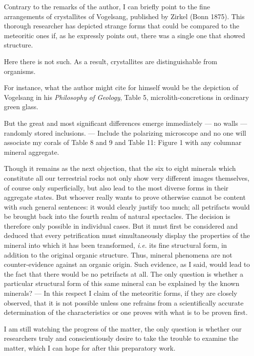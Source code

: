 \documentclass[a4paper, 12pt, oneside]{article}
\begin{document}
Contrary to the remarks of the author, I can briefly point to the fine arrangements of crystallites of Vogelsang, published by Zirkel (Bonn 1875). This thorough researcher has depicted strange forms that could be compared to the meteoritic ones if, as he expressly points out, there was a single one that showed structure.

Here there is not such. As a result, crystallites are distinguishable from organisms.

For instance, what the author might cite for himself would be the depiction of Vogelsang in his \emph{Philosophy of Geology}, Table 5, microlith-concretions in ordinary green glass.

But the great and most significant differences emerge immediately --- no walls --- randomly stored inclusions. --- Include the polarizing microscope and no one will associate my corals of Table 8 and 9 and Table 11: Figure 1 with any columnar mineral aggregate.

Though it remains as the next objection, that the six to eight minerals which constitute all our terrestrial rocks not only show very different images themselves, of course only superficially, but also lead to the most diverse forms in their aggregate states. But whoever really wants to prove otherwise cannot be content with such general sentences: it would clearly justify too much; all petrifacts would be brought back into the fourth realm of natural spectacles. The decision is therefore only possible in individual cases. But it must first be considered and deduced that every petrification must simultaneously display the properties of the mineral into which it has been transformed, \emph{i.e.} its fine structural form, in addition to the original organic structure. Thus, mineral phenomena are not counter-evidence against an organic origin. Such evidence, as I said, would lead to the fact that there would be no petrifacts at all. The only question is whether a particular structural form of this same mineral can be explained by the known minerals? --- In this respect I claim of the meteoritic forms, if they are closely observed, that it is not possible unless one refrains from a scientifically accurate determination of the characteristics or one proves with what is to be proven first.

I am still watching the progress of the matter, the only question is whether our researchers truly and conscientiously desire to take the trouble to examine the matter, which I can hope for after this preparatory work.
\end{document}
